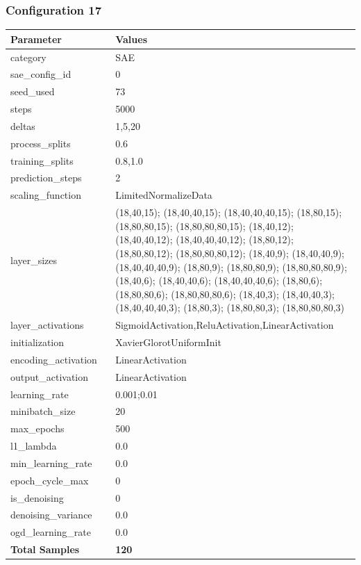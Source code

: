 \documentclass[a4paper,11pt,oneside]{article}
\theoremstyle{plain}
\theoremstyle{definition}
\begin{document}
	\newpage
	\subsubsection{Configuration 17}\label{config17}
	\begin{longtable}[H]{|p{0.3\linewidth}|p{0.7\linewidth}|} \hline \textbf{Parameter} &\textbf{Values} \\\hline{category} & {SAE} \\\hline
		{sae\_config\_id} & {0} \\\hline
		{seed\_used} & {73} \\\hline
		{steps} & {5000} \\\hline
		{deltas} & {1,5,20} \\\hline
		{process\_splits} & {0.6} \\\hline
		{training\_splits} & {0.8,1.0} \\\hline
		{prediction\_steps} & {2} \\\hline
		{scaling\_function} & {LimitedNormalizeData} \\\hline
		{layer\_sizes} & {(18,40,15); (18,40,40,15); (18,40,40,40,15); (18,80,15); (18,80,80,15); (18,80,80,80,15); (18,40,12); (18,40,40,12); (18,40,40,40,12); (18,80,12); (18,80,80,12); (18,80,80,80,12); (18,40,9); (18,40,40,9); (18,40,40,40,9); (18,80,9); (18,80,80,9); (18,80,80,80,9); (18,40,6); (18,40,40,6); (18,40,40,40,6); (18,80,6); (18,80,80,6); (18,80,80,80,6); (18,40,3); (18,40,40,3); (18,40,40,40,3); (18,80,3); (18,80,80,3); (18,80,80,80,3)} \\\hline
		{layer\_activations} & {SigmoidActivation,ReluActivation,LinearActivation} \\\hline
		{initialization} & {XavierGlorotUniformInit} \\\hline
		{encoding\_activation} & {LinearActivation} \\\hline
		{output\_activation} & {LinearActivation} \\\hline
		{learning\_rate} & {0.001;0.01} \\\hline
		{minibatch\_size} & {20} \\\hline
		{max\_epochs} & {500} \\\hline
		{l1\_lambda} & {0.0} \\\hline
		{min\_learning\_rate} & {0.0} \\\hline
		{epoch\_cycle\_max} & {0} \\\hline
		{is\_denoising} & {0} \\\hline
		{denoising\_variance} & {0.0} \\\hline
		{ogd\_learning\_rate} & {0.0} \\\hline
		{\textbf{Total Samples}} & {\textbf{120}} \\\hline
	\end{longtable}
	
\end{document}
